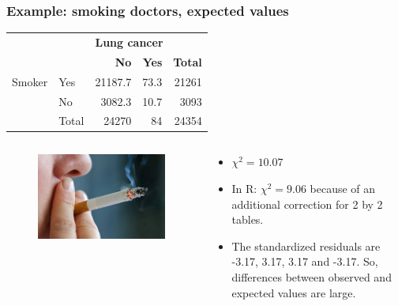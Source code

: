 \documentclass{beamer}
\begin{document}
\begin{frame}
  \frametitle{Example: smoking doctors, expected values}
  
\begin{table}[h]
    \begin{tabular}{@{}|ll|rr|r|@{}}
    \toprule
& & \multicolumn{3}{l|}{\textbf{Lung cancer}} \\
& & \textbf{No} & \textbf{Yes} & \textbf{Total} \\ \midrule
Smoker & Yes                 & 21187.7         & 73.3         & 21261           \\
      & No                & 3082.3        & 10.7         & 3093            \\ \midrule
      & Total              & 24270         & 84           & 24354           \\ \bottomrule
\end{tabular}
\end{table}

\begin{columns}
  \begin{column}{0.3 \textwidth}

  \begin{figure}
    \centering
      \includegraphics[width=1.00\textwidth]{img/les-6-smoking.jpg}
  \end{figure}

  \end{column}
  \begin{column}{0.7 \textwidth}

  \begin{itemize}
    \item $\chi^{2} = 10.07$
    \item In R: $\chi^{2} = 9.06$ because of an additional correction for 2 by 2 tables.
    \item The standardized residuals are -3.17, 3.17, 3.17 and -3.17. So, differences between observed and expected values are large.
  \end{itemize}
  \end{column}
\end{columns}
\end{frame}
\end{document}
